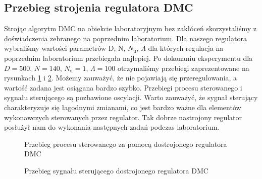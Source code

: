 \subsection{Przebieg strojenia regulatora DMC}
Strojąc algorytm DMC na obiekcie laboratoryjnym bez zakłóceń skorzystaliśmy z doświadczenia zebranego na poprzednim laboratorium. Dla naszego regulatora wybraliśmy wartości parametrów D, N, $N_\mathrm{u}$, $\Lambda$ dla których regulacja na poprzednim laboratorium przebiegała najlepiej.
\indent Po dokonaniu eksperymentu dla $D = 500$, $N = 140$, $N_\mathrm{u} = 1$, $\Lambda = 100$ otrzymaliśmy przebiegi zaprezentowane na rysunkach \ref{lab_zad4_lab_proces} i \ref{lab_zad4_lab_ster}. Możemy zauważyć, że nie pojawiają się przeregulowania, a wartość zadana jest osiągana bardzo szybko. 
\indent Przebiegi procesu sterowanego i sygnału sterującego są pozbawione oscylacji. Warto zauważyć, że sygnał sterujący charakteryzuje się łagodnymi zmianami, co jest bardzo ważne dla elementów wykonawczych sterowanych przez regulator. Tak dobrze nastrojony regulator posłużył nam do wykonania następnych zadań podczas laboratorium. 
\begin{figure}[t]
    \label{lab_zad4_lab_proces}
    \centering
    \caption{Przebieg procesu sterowanego za pomocą dostrojonego regulatora DMC}
\end{figure}

\begin{figure}[b]
    \label{lab_zad4_lab_ster}
    \centering
    \caption{Przebieg sygnału sterującego dostrojonego regulatora DMC}
\end{figure}
\FloatBarrier
